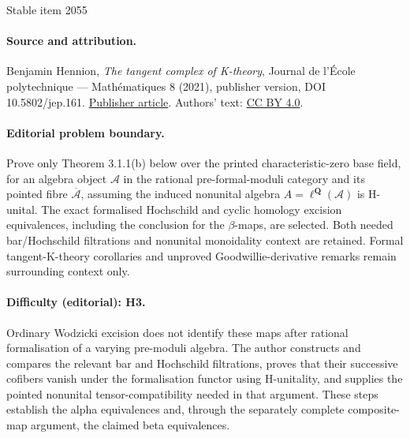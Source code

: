 \documentclass[11pt]{article}
\begin{document}
\begin{center}{\Large Stable item 2055}\end{center}
\paragraph{Source and attribution.}
Benjamin Hennion, \emph{The tangent complex of K-theory}, Journal de l’École polytechnique — Mathématiques 8 (2021), publisher version, DOI 10.5802/jep.161. \href{https://jep.centre-mersenne.org/articles/10.5802/jep.161/}{Publisher article}. Authors' text: \href{https://creativecommons.org/licenses/by/4.0/}{CC BY 4.0}.
\paragraph{Editorial problem boundary.}
Prove only Theorem 3.1.1(b) below over the printed characteristic-zero base field, for an algebra object \(\mathcal A\) in the rational pre-formal-moduli category and its pointed fibre \(\overline{\mathcal A}\), assuming the induced nonunital algebra \(A=\ell^{\mathbf Q}(\mathcal A)\) is H-unital. The exact formalised Hochschild and cyclic homology excision equivalences, including the conclusion for the \(\beta\)-maps, are selected. Both needed bar/Hochschild filtrations and nonunital monoidality context are retained. Formal tangent-K-theory corollaries and unproved Goodwillie-derivative remarks remain surrounding context only.
\paragraph{Difficulty (editorial): H3.}
Ordinary Wodzicki excision does not identify these maps after rational formalisation of a varying pre-moduli algebra. The author constructs and compares the relevant bar and Hochschild filtrations, proves that their successive cofibers vanish under the formalisation functor using H-unitality, and supplies the pointed nonunital tensor-compatibility needed in that argument. These steps establish the alpha equivalences and, through the separately complete composite-map argument, the claimed beta equivalences.
\end{document}
